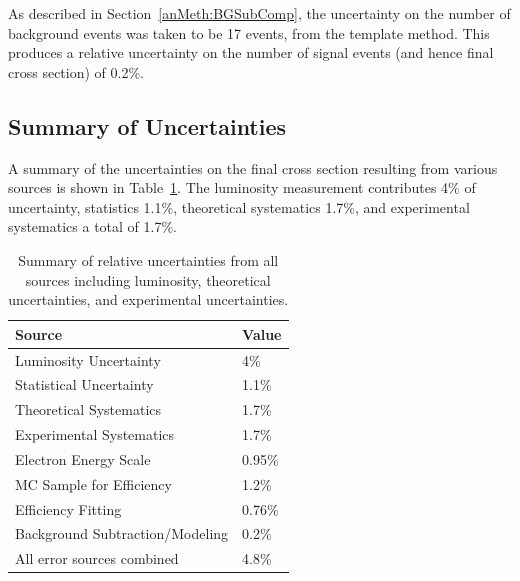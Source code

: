 
As described in Section~\ref{anMeth:BGSubComp}, 
the uncertainty on the number of background 
events was taken to be 17 events, 
from the template method.  
This produces a relative uncertainty 
on the number of signal events 
(and hence final cross section) 
of 0.2\%.  

\subsection{Summary of Uncertainties}
\label{anMeth:SystsSummary}

A summary of the uncertainties on the final 
cross section resulting from various sources 
is shown in Table~\ref{TableSystsSummary}.  
The luminosity measurement 
contributes 4\% of uncertainty, 
statistics 1.1\%, 
theoretical systematics 1.7\%, 
and experimental systematics a total of 1.7\%.  

\begin{table}[htbp]
  \begin{center}
    \caption[\fixspacing Summary of uncertainties]{
      \fixspacing Summary of relative uncertainties from all sources 
      including luminosity, theoretical uncertainties, 
      and experimental uncertainties.  
    }
    \label{TableSystsSummary}
    \begin{tabular}[]{ | l | l | }
      \hline
      Source & Value  \\ \hline \hline
      Luminosity Uncertainty & 4\% \\ \hline 
      Statistical Uncertainty & 1.1\% \\ \hline 
      Theoretical Systematics & 1.7\% \\ \hline \hline 
      Experimental Systematics & 1.7\% \\ \hline \hline 
      Electron Energy Scale & 0.95\% \\ \hline 
      MC Sample for Efficiency & 1.2\% \\ \hline 
      Efficiency Fitting & 0.76\% \\ \hline 
      Background Subtraction/Modeling & 0.2\% \\ \hline \hline 
      All error sources combined & 4.8\% \\ \hline 
    \end{tabular}
  \end{center}
\end{table}


